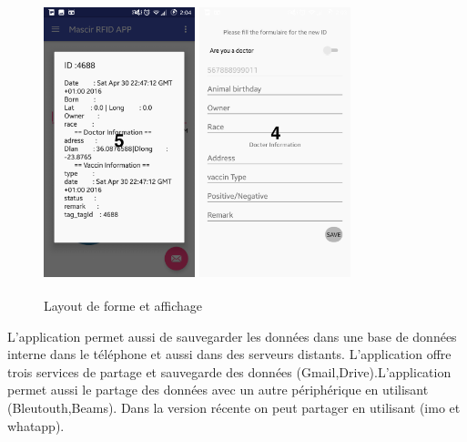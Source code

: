 \documentclass[11pt, a4paper, twoside]{book}
\begin{document}
\begin{figure}[H]
\centering
\includegraphics[width=4.4cm,height=8cm]{showdialog}
\includegraphics[width=4.4cm,height=8cm]{form}
\caption{Layout de forme et affichage}
\end{figure}

L'application permet aussi de sauvegarder les données dans une base de données interne dans le téléphone et aussi dans des serveurs distants. L'application offre trois services de partage et sauvegarde des données (Gmail,Drive).L'application permet aussi le partage des données avec un autre périphérique en utilisant (Bleutouth,Beams). Dans la version récente on peut partager en utilisant (imo et whatapp).
 
\end{document}
